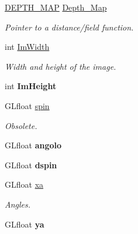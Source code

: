 \begin{DoxyCompactItemize}
\item 
\hyperlink{classDraw_a667fca5fb3b2ab1229ca1043c733a765}{D\+E\+P\+T\+H\+\_\+\+M\+AP} \hyperlink{classDraw_a840dda96dc55e47741fc47e2a7c80526}{Depth\+\_\+\+Map}\hypertarget{classDraw_a840dda96dc55e47741fc47e2a7c80526}{}\label{classDraw_a840dda96dc55e47741fc47e2a7c80526}

\begin{DoxyCompactList}\small\item\em Pointer to a distance/field function. \end{DoxyCompactList}\item 
int \hyperlink{classDraw_ab92a87c2480115eaf15a27a8fa0cd965}{Im\+Width}\hypertarget{classDraw_ab92a87c2480115eaf15a27a8fa0cd965}{}\label{classDraw_ab92a87c2480115eaf15a27a8fa0cd965}

\begin{DoxyCompactList}\small\item\em Width and height of the image. \end{DoxyCompactList}\item 
int {\bfseries Im\+Height}\hypertarget{classDraw_abd2f71d308d9b0a27e2c047fc7af3aa4}{}\label{classDraw_abd2f71d308d9b0a27e2c047fc7af3aa4}

\item 
G\+Lfloat \hyperlink{classDraw_a31a0a56b0946f085f98ad55b0d06d072}{spin}\hypertarget{classDraw_a31a0a56b0946f085f98ad55b0d06d072}{}\label{classDraw_a31a0a56b0946f085f98ad55b0d06d072}

\begin{DoxyCompactList}\small\item\em Obsolete. \end{DoxyCompactList}\item 
G\+Lfloat {\bfseries angolo}\hypertarget{classDraw_af8bb07b668883a1aeaad90da7202c8ef}{}\label{classDraw_af8bb07b668883a1aeaad90da7202c8ef}

\item 
G\+Lfloat {\bfseries dspin}\hypertarget{classDraw_a4a17821d6cf2e874a3a7c8a00be88b9e}{}\label{classDraw_a4a17821d6cf2e874a3a7c8a00be88b9e}

\item 
G\+Lfloat \hyperlink{classDraw_aee18a4afd2986ed1f3be1939903b9539}{xa}\hypertarget{classDraw_aee18a4afd2986ed1f3be1939903b9539}{}\label{classDraw_aee18a4afd2986ed1f3be1939903b9539}

\begin{DoxyCompactList}\small\item\em Angles. \end{DoxyCompactList}\item 
G\+Lfloat {\bfseries ya}\hypertarget{classDraw_a7a543ac8488e183173150a9da70b611e}{}\label{classDraw_a7a543ac8488e183173150a9da70b611e}


\end{DoxyCompactItemize}

